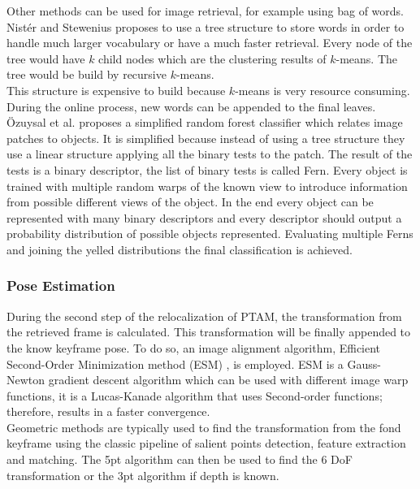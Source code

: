 Other methods can be used for image retrieval, for example using bag of words. Nist\'er and Stewenius \cite{Nister2006} proposes to use a tree structure to store words in order to handle much larger vocabulary or have a much faster retrieval. Every node of the tree would have $k$ child nodes which are the clustering results of $k$-means. The tree would be build by recursive $k$-means.\\

This structure is expensive to build because $k$-means is very resource consuming. During the online process, new words can be appended to the final leaves.\\

\"Ozuysal et al. \cite{Ozuysal2010} proposes a simplified random forest classifier which relates image patches to objects. It is simplified because instead of using a tree structure they use a linear structure applying all the binary tests to the patch. The result of the tests is a binary descriptor, the list of binary tests is called Fern. Every object is trained with multiple random warps of the known view to introduce information from possible different views of the object. In the end every object can be represented with many binary descriptors and every descriptor should output a probability distribution of possible objects represented. Evaluating multiple Ferns and joining the yelled distributions the final classification is achieved.\\

\subsubsection{Pose Estimation}
\label{ssub:pose_estimation}


During the second step of the relocalization of PTAM, the transformation from the retrieved frame is calculated. This transformation will be finally appended to the know keyframe pose. To do so, an image alignment algorithm, Efficient Second-Order Minimization method (ESM) \cite{Benhimane2006}, is employed. ESM is a Gauss-Newton gradient descent algorithm which can be used with different image warp functions, it is a Lucas-Kanade \cite{Baker2004} algorithm that uses Second-order functions; therefore, results in a faster convergence.\\

Geometric methods are typically used to find the transformation from the fond keyframe using the classic pipeline of salient points detection, feature extraction and matching. The 5pt algorithm can then be used to find the 6 DoF transformation or the 3pt algorithm if depth is known.


